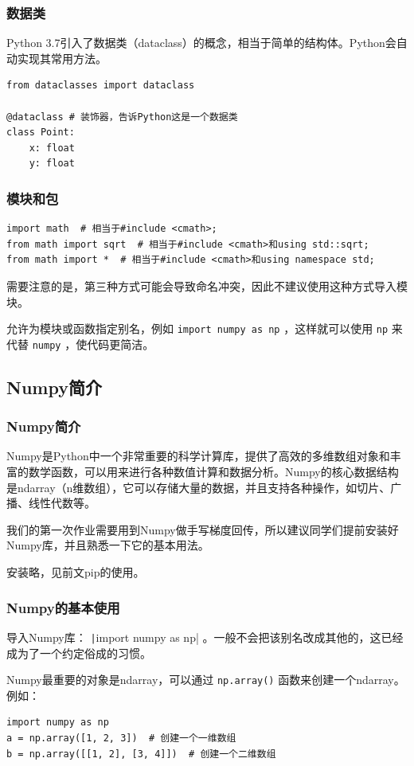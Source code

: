 \begin{frame}[fragile]
    \frametitle{数据类}

    Python 3.7引入了数据类（dataclass）的概念，相当于简单的结构体。Python会自动实现其常用方法。

    \begin{verbatim}
from dataclasses import dataclass

@dataclass # 装饰器，告诉Python这是一个数据类
class Point:
    x: float
    y: float
    \end{verbatim}

\end{frame}

\begin{frame}[fragile]
    \frametitle{模块和包}

    \begin{verbatim}
import math  # 相当于#include <cmath>;
from math import sqrt  # 相当于#include <cmath>和using std::sqrt;
from math import *  # 相当于#include <cmath>和using namespace std;
    \end{verbatim}
    需要注意的是，第三种方式可能会导致命名冲突，因此不建议使用这种方式导入模块。

    允许为模块或函数指定别名，例如 \texttt{import numpy as np} ，这样就可以使用 \texttt{np} 来代替 \texttt{numpy} ，使代码更简洁。
\end{frame}

\subsection{Numpy简介}

\begin{frame}
    \frametitle{Numpy简介}

    Numpy是Python中一个非常重要的科学计算库，提供了高效的多维数组对象和丰富的数学函数，可以用来进行各种数值计算和数据分析。Numpy的核心数据结构是ndarray（n维数组），它可以存储大量的数据，并且支持各种操作，如切片、广播、线性代数等。

    我们的第一次作业需要用到Numpy做手写梯度回传，所以建议同学们提前安装好Numpy库，并且熟悉一下它的基本用法。

    安装略，见前文pip的使用。

\end{frame}

\begin{frame}[fragile]
    \frametitle{Numpy的基本使用}

    导入Numpy库： \texttt|import numpy as np| 。一般不会把该别名改成其他的，这已经成为了一个约定俗成的习惯。

    Numpy最重要的对象是ndarray，可以通过 \texttt{np.array()} 函数来创建一个ndarray。例如：
    \begin{verbatim}
import numpy as np
a = np.array([1, 2, 3])  # 创建一个一维数组
b = np.array([[1, 2], [3, 4]])  # 创建一个二维数组
    \end{verbatim}

\end{frame}

